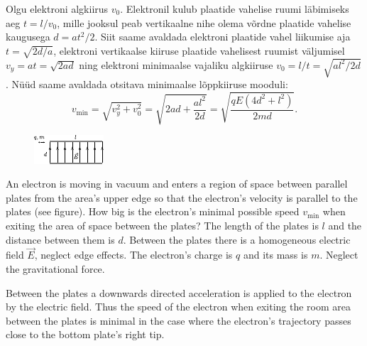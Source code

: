 {Olgu elektroni algkiirus $v_0$. Elektronil kulub plaatide vahelise ruumi läbimiseks aeg $t=l/v_0$, mille jooksul peab vertikaalne nihe olema võrdne plaatide vahelise kaugusega $d=at^2/2$. Siit saame avaldada elektroni plaatide vahel liikumise aja $t=\sqrt{2d/a}$, elektroni vertikaalse kiiruse plaatide vahelisest ruumist väljumisel $v_y=at=\sqrt{2ad}$ ning elektroni minimaalse vajaliku algkiiruse $v_0=l/t=\sqrt{al^2/2d}$. Nüüd saame avaldada otsitava minimaalse lõppkiiruse mooduli:
\[
v_\mathrm{min}=\sqrt{v_y^2+v_0^2}=\sqrt{2ad+\frac{al^2}{2d}}=\sqrt{\frac{qE\left(4d^2+l^2\right)}{2md}}.
\]
\fi


\ifEngStatement
\begin{figure}
	\vspace{-10pt}
	\hspace{-10pt}
	\includegraphics[width=\linewidth]{2017-lahg-03-elJoonisMK}
\end{figure}
An electron is moving in vacuum and enters a region of space between parallel plates from the area’s upper edge so that the electron’s velocity is parallel to the plates (see figure). How big is the electron’s minimal possible speed $v_\mathrm{min}$ when exiting the area of space between the plates? The length of the plates is $l$ and the distance between them is $d$. Between the plates there is a homogeneous electric field $\vec{E}$, neglect edge effects. The electron’s charge is $q$ and its mass is $m$. Neglect the gravitational force.
\fi


\ifEngHint
Between the plates a downwards directed acceleration is applied to the electron by the electric field. Thus the speed of the electron when exiting the room area between the plates is minimal in the case where the electron's trajectory passes close to the bottom plate's right tip.
\fi


}
